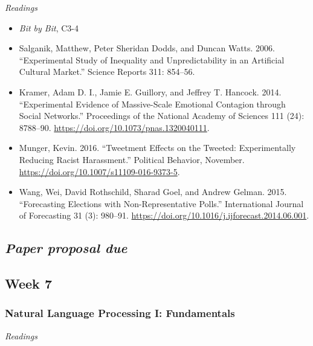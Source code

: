 \documentclass[
  10pt,
]{article}
\providecommand{\tightlist}{%
  \setlength{\itemsep}{0pt}\setlength{\parskip}{0pt}}
\begin{document}
\emph{Readings}

\begin{itemize}
\tightlist
\item
  \emph{Bit by Bit}, C3-4
\item
  Salganik, Matthew, Peter Sheridan Dodds, and Duncan Watts. 2006.
  ``Experimental Study of Inequality and Unpredictability in an
  Artificial Cultural Market.'' Science Reports 311: 854--56.
\item
  Kramer, Adam D. I., Jamie E. Guillory, and Jeffrey T. Hancock. 2014.
  ``Experimental Evidence of Massive-Scale Emotional Contagion through
  Social Networks.'' Proceedings of the National Academy of Sciences 111
  (24): 8788--90. \url{https://doi.org/10.1073/pnas.1320040111}.
\item
  Munger, Kevin. 2016. ``Tweetment Effects on the Tweeted:
  Experimentally Reducing Racist Harassment.'' Political Behavior,
  November. \url{https://doi.org/10.1007/s11109-016-9373-5}.
\item
  Wang, Wei, David Rothschild, Sharad Goel, and Andrew Gelman. 2015.
  ``Forecasting Elections with Non-Representative Polls.'' International
  Journal of Forecasting 31 (3): 980--91.
  \url{https://doi.org/10.1016/j.ijforecast.2014.06.001}.
\end{itemize}

\hypertarget{paper-proposal-due}{%
\subsection{\texorpdfstring{\emph{Paper proposal
due}}{Paper proposal due}}\label{paper-proposal-due}}

\hypertarget{week-7}{%
\subsection{Week 7}\label{week-7}}

\hypertarget{natural-language-processing-i-fundamentals}{%
\subsubsection{Natural Language Processing I:
Fundamentals}\label{natural-language-processing-i-fundamentals}}

\emph{Readings}
\end{document}
